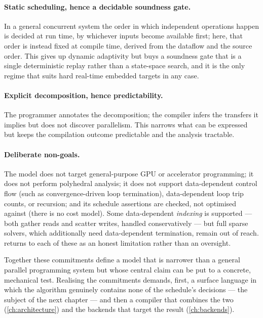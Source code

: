 \paragraph{Static scheduling, hence a decidable soundness gate.} In a general
concurrent system the order in which independent operations happen is decided at
run time, by whichever inputs become available first; here, that order is instead
fixed at compile time, derived from the dataflow and the source order. This gives
up dynamic adaptivity but buys a soundness gate that is a single deterministic
replay rather than a state-space search, and it is the only regime that suits hard
real-time embedded targets in any case.

\paragraph{Explicit decomposition, hence predictability.} The programmer
annotates the decomposition; the compiler infers the transfers it implies but
does not discover parallelism. This narrows what can be expressed but keeps the
compilation outcome predictable and the analysis tractable.

\paragraph{Deliberate non-goals.} The model does not target general-purpose GPU
or accelerator programming; it does not perform polyhedral analysis; it does not
support data-dependent control flow (such as convergence-driven loop
termination), data-dependent loop trip counts, or recursion; and its schedule
assertions are checked, not optimised against (there is no cost model). Some
data-dependent \emph{indexing} is supported --- both gather reads and scatter
writes, handled conservatively --- but full sparse solvers, which additionally
need data-dependent termination, remain out of reach. 
returns to each of these as an honest limitation rather than an oversight.

Together these commitments define a model that is narrower than a general
parallel programming system but whose central claim can be put to a concrete,
mechanical test. Realising the commitments demands, first, a surface language in
which the algorithm genuinely contains none of the schedule's decisions --- the
subject of the next chapter --- and then a compiler that combines the two
(\cref{ch:architecture}) and the backends that target the result
(\cref{ch:backends}).

